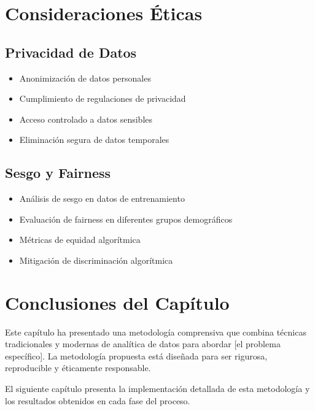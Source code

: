 \section{Consideraciones Éticas}

\subsection{Privacidad de Datos}

\begin{itemize}
    \item Anonimización de datos personales
    \item Cumplimiento de regulaciones de privacidad
    \item Acceso controlado a datos sensibles
    \item Eliminación segura de datos temporales
\end{itemize}

\subsection{Sesgo y Fairness}

\begin{itemize}
    \item Análisis de sesgo en datos de entrenamiento
    \item Evaluación de fairness en diferentes grupos demográficos
    \item Métricas de equidad algorítmica
    \item Mitigación de discriminación algorítmica
\end{itemize}

\section{Conclusiones del Capítulo}

Este capítulo ha presentado una metodología comprensiva que combina técnicas tradicionales y modernas de analítica de datos para abordar [el problema específico]. La metodología propuesta está diseñada para ser rigurosa, reproducible y éticamente responsable.

El siguiente capítulo presenta la implementación detallada de esta metodología y los resultados obtenidos en cada fase del proceso.
